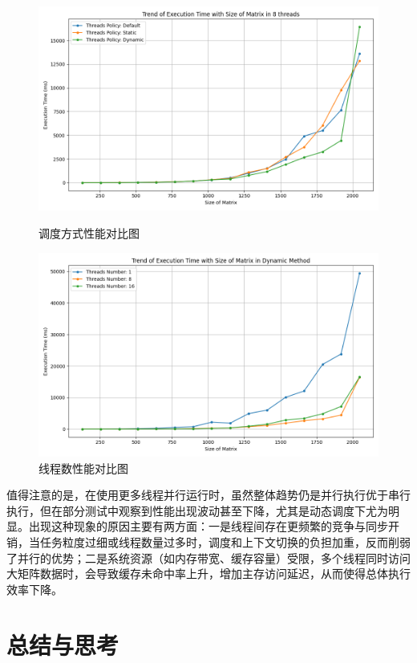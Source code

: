 \documentclass[a4paper, utf8]{ctexart}
\begin{document}
	\begin{figure}[htbp]
		\centering
		\begin{minipage}{.45\textwidth}
			\centering
			\includegraphics[width=.8\textwidth]{./figure/method_time_trend.png}
			\caption{调度方式性能对比图}
		\end{minipage}
		\begin{minipage}{.45\textwidth}
			\centering
			\includegraphics[width=.8\textwidth]{./figure/threads_time_trend.png}
			\caption{线程数性能对比图}
		\end{minipage}
	\end{figure}
	
	值得注意的是，在使用更多线程并行运行时，虽然整体趋势仍是并行执行优于串行执行，但在部分测试中观察到性能出现波动甚至下降，尤其是动态调度下尤为明显。出现这种现象的原因主要有两方面：一是线程间存在更频繁的竞争与同步开销，当任务粒度过细或线程数量过多时，调度和上下文切换的负担加重，反而削弱了并行的优势；二是系统资源（如内存带宽、缓存容量）受限，多个线程同时访问大矩阵数据时，会导致缓存未命中率上升，增加主存访问延迟，从而使得总体执行效率下降。
	
	\section{总结与思考}
	
\end{document}

